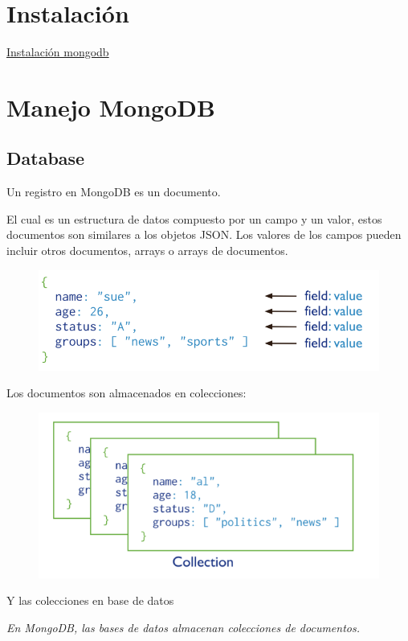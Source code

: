 \documentclass[4paper]{article}
\begin{document}
\section{Instalación}

\href{https://docs.mongodb.com/manual/administration/install-community/}{Instalación mongodb}

\section{Manejo MongoDB}
\subsection{Database}
\begin{LARGE}
Un registro en MongoDB es un documento.\\

\end{LARGE}El cual es un estructura de datos compuesto por un campo y un valor, estos documentos son similares a los objetos JSON. Los valores de los campos pueden incluir otros documentos, arrays o arrays de documentos.

\begin{figure}[H]
\includegraphics[scale=0.5]{documentos.png}
\end{figure}

Los documentos son almacenados en colecciones:
\begin{figure}[H]
\includegraphics[scale=0.5]{colecciones.png}
\end{figure}
Y las colecciones en base de datos\\
\begin{center}
\begin{Large}
\textit{En MongoDB, las bases de datos almacenan colecciones de documentos.}
\end{Large}
\end{center}
\end{document}
